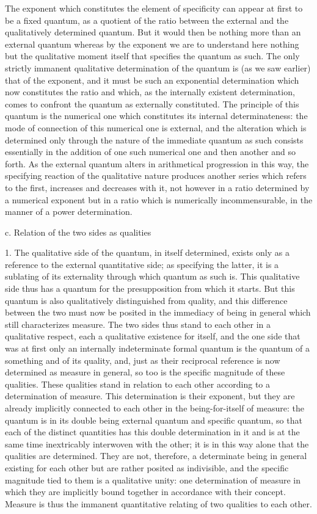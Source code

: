 The exponent which constitutes the element of specificity can appear
at first to be a fixed quantum, as a quotient of the ratio between the
external and the qualitatively determined quantum.
But it would then be nothing more than an external quantum
whereas by the exponent we are to understand here nothing
but the qualitative moment itself that specifies the quantum as such.
The only strictly immanent qualitative determination of
the quantum is (as we saw earlier) that of the exponent,
and it must be such an exponential determination
which now constitutes the ratio and which,
as the internally existent determination,
comes to confront the quantum as externally constituted.
The principle of this quantum is the numerical one
which constitutes its internal determinateness:
the mode of connection of this numerical one is external,
and the alteration which is determined only
through the nature of the immediate quantum as such consists
essentially in the addition of one such numerical one
and then another and so forth.
As the external quantum alters in arithmetical progression in this way,
the specifying reaction of the qualitative nature produces another series
which refers to the first, increases and decreases with it,
not however in a ratio determined by a numerical exponent
but in a ratio which is numerically incommensurable,
in the manner of a power determination.

c. Relation of the two sides as qualities

1. The qualitative side of the quantum, in itself determined,
exists only as a reference to the external quantitative side;
as specifying the latter, it is a sublating of its externality
through which quantum as such is.
This qualitative side thus has a quantum
for the presupposition from which it starts.
But this quantum is also qualitatively distinguished from quality,
and this difference between the two must now be posited in the immediacy
of being in general which still characterizes measure.
The two sides thus stand to each other in a qualitative respect,
each a qualitative existence for itself,
and the one side that was at first only an internally indeterminate
formal quantum is the quantum of a something and of its quality,
and, just as their reciprocal reference is
now determined as measure in general,
so too is the specific magnitude of these qualities.
These qualities stand in relation to each other according
to a determination of measure.
This determination is their exponent,
but they are already implicitly connected
to each other in the being-for-itself of measure:
the quantum is in its double being
external quantum and specific quantum,
so that each of the distinct quantities has
this double determination in it
and is at the same time inextricably interwoven with the other;
it is in this way alone that the qualities are determined.
They are not, therefore, a determinate being in general
existing for each other but are rather posited as indivisible,
and the specific magnitude tied to them is a qualitative unity:
one determination of measure in which they are
implicitly bound together in accordance with their concept.
Measure is thus the immanent quantitative relating
of two qualities to each other.

